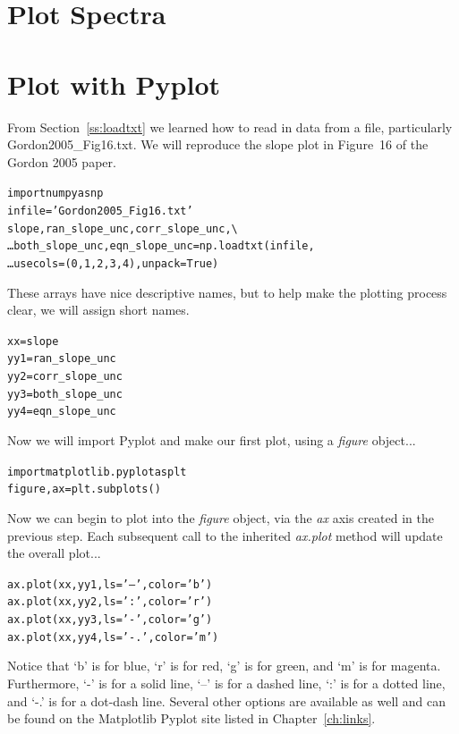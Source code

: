 \section{Plot Spectra}








\section{Plot with Pyplot}
From Section~\ref{ss:loadtxt} we learned how to read in data from a
file, particularly Gordon2005\_Fig16.txt.  We will reproduce the slope
plot in Figure~16 of the Gordon 2005 paper.

\begin{alltt}
\pytab import numpy as np 
\pytab infile = 'Gordon2005_Fig16.txt' 
\pytab slope, ran_slope_unc, corr_slope_unc, \textbackslash 
\ldots      both_slope_unc, eqn_slope_unc = np.loadtxt(infile, 
\ldots      usecols=(0, 1, 2, 3, 4), unpack=True) 
\end{alltt}

These arrays have nice descriptive names, but to help make the
plotting process clear, we will assign short names.

\begin{alltt}
\pytab xx = slope  
\pytab yy1 = ran_slope_unc  
\pytab yy2 = corr_slope_unc  
\pytab yy3 = both_slope_unc
\pytab yy4 = eqn_slope_unc 
\end{alltt}

Now we will import Pyplot and make our first plot, using a \textit{figure} 
object...

\begin{alltt}
\pytab import matplotlib.pyplot as plt  
\pytab figure, ax = plt.subplots()
\end{alltt}

Now we can begin to plot into the \textit{figure} object, via the \textit{ax} 
axis created in the previous step. Each subsequent call to the inherited 
\textit{ax.plot} method will update the overall plot... 

\begin{alltt}
\pytab ax.plot(xx, yy1, ls='--', color='b')
\pytab ax.plot(xx, yy2, ls=':', color='r')
\pytab ax.plot(xx, yy3, ls='-', color='g')
\pytab ax.plot(xx, yy4, ls='-.', color='m')
\end{alltt}

Notice that `b' is for blue, `r' is for red, `g' is for green, and `m'
is for magenta.  Furthermore, `-' is for a solid line, `--' is for a
dashed line, `:' is for a dotted line, and `-.' is for a dot-dash
line.  Several other options are available as well and can be found on
the Matplotlib Pyplot site listed in Chapter~\ref{ch:links}. 

